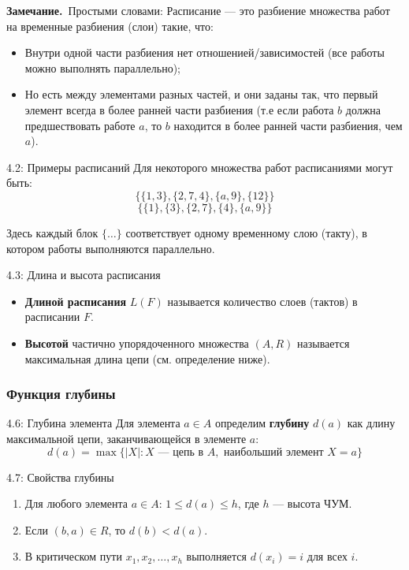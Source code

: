 \documentclass[a4paper,12pt]{article}
\newcommand{\myremark}{\textbf{Замечание.}\ }
\begin{document}
	\myremark{Простыми словами:} Расписание — это разбиение множества работ на временные разбиения (слои) такие, что:
	\begin{itemize}
		\item Внутри одной части разбиения нет отношенией/зависимостей (все работы можно выполнять параллельно);
		\item Но есть между элементами разных частей, и они заданы так, что первый элемент всегда в более ранней части разбиения (т.е если работа $b$ должна предшествовать работе $a$, то $b$ находится в более ранней части разбиения, чем $a$).
	\end{itemize}
	
	\begin{examplebox}{4.2: Примеры расписаний}
		Для некоторого множества работ расписаниями могут быть:
		\[ \{\{1, 3\}, \{2, 7, 4\}, \{a, 9\}, \{12\}\} \]
		\[ \{\{1\}, \{3\}, \{2, 7\}, \{4\}, \{a, 9\}\} \]
		
		Здесь каждый блок $\{\dots\}$ соответствует одному временному слою (такту), 
		в котором работы выполняются параллельно.
	\end{examplebox}
	
	\begin{definitionbox}{4.3: Длина и высота расписания}
		\begin{itemize}
			\item \textbf{Длиной расписания} $L(F)$ называется количество слоев (тактов) в расписании $F$.
			\item \textbf{Высотой} частично упорядоченного множества $(A,R)$ называется максимальная длина цепи (см. определение ниже).
		\end{itemize}
	\end{definitionbox}
		
	\subsubsection{Функция глубины}
	
	\begin{definitionbox}{4.6: Глубина элемента}
		Для элемента $a \in A$ определим \textbf{глубину} $d(a)$ как длину максимальной цепи, заканчивающейся в элементе $a$:
		\[ d(a) = \max\{ |X| : X \text{ — цепь в } A, \text{ наибольший элемент } X = a \} \]
	\end{definitionbox}
	
	\begin{lemmabox}{4.7: Свойства глубины}
		\begin{enumerate}
			\item Для любого элемента $a \in A$: $1 \le d(a) \le h$, где $h$ — высота ЧУМ.
			\item Если $(b,a) \in R$, то $d(b) < d(a)$.
			\item В критическом пути $x_1, x_2, \dots, x_h$ выполняется $d(x_i) = i$ для всех $i$.
		\end{enumerate}
	\end{lemmabox}
	
\end{document}
